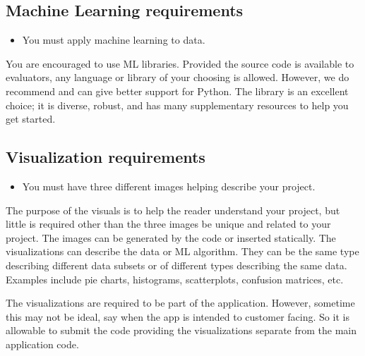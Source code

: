 \documentclass[letterpaper,10pt,english]{jupyterBook}
\begin{document}
\subsection{Machine Learning requirements}
\label{\detokenize{task2_c/task2_part_c:machine-learning-requirements}}\label{\detokenize{task2_c/task2_part_c:task2-part-c-mlreqs}}\begin{itemize}
\item {} 
\sphinxAtStartPar
You must apply machine learning to data.

\end{itemize}

\sphinxAtStartPar
You are encouraged to use ML libraries. Provided the source code is available to evaluators, any language or library of your choosing is allowed. However, we do recommend and can give better support for Python. The  library is an excellent choice; it is diverse, robust, and has many supplementary resources to help you get started.


\subsection{Visualization requirements}
\label{\detokenize{task2_c/task2_part_c:visualization-requirements}}\label{\detokenize{task2_c/task2_part_c:task2c-visualreqs}}\begin{itemize}
\item {} 
\sphinxAtStartPar
You must have three different images helping describe your project.

\end{itemize}

\sphinxAtStartPar
The purpose of the visuals is to help the reader understand your project, but little is required other than the three images be unique and related to your project. The images can be generated by the code or inserted statically. The visualizations can describe the data or ML algorithm. They can be the same type describing different data subsets or of different types describing the same data. Examples include pie charts, histograms, scatterplots, confusion matrices, etc.

\sphinxAtStartPar
The visualizations are required to be part of the application. However, sometime this may not be ideal, say when the app is intended to customer facing. So it is allowable to submit the code providing the visualizations separate from the main application code.
\end{document}
